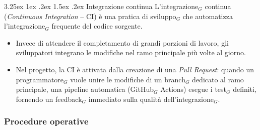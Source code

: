 \documentclass[a4paper, 10pt]{article}
\makeatletter
\renewcommand\paragraph{\@startsection{paragraph}{4}{\z@}%
  {3.25ex \@plus1ex \@minus .2ex}%
  {1.5ex \@plus .2ex}%
  {\normalfont\normalsize\bfseries}}
\makeatother
\begin{document}
\paragraph{Integrazione continua}
L'integrazione$_G$ continua (\emph{Continuous Integration} -- CI) è una pratica di sviluppo$_G$ che automatizza l'integrazione$_G$ frequente del codice sorgente.
\begin{itemize}
    \item Invece di attendere il completamento di grandi porzioni di lavoro, gli sviluppatori integrano le modifiche nel ramo principale più volte al giorno.
    \item Nel progetto, la CI è attivata dalla creazione di una \emph{Pull Request}: quando un programmatore$_G$ vuole unire le modifiche di un branch$_G$ dedicato al ramo principale, una pipeline automatica (GitHub$_G$ Actions) esegue i test$_G$ definiti, fornendo un feedback$_G$ immediato sulla qualità dell'integrazione$_G$.
\end{itemize}

\subsubsection{Procedure operative}
\label{subsec:procedure_operative}
\end{document}
